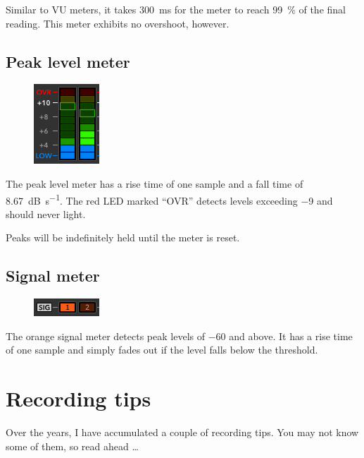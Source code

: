 Similar to VU meters, it takes \SI{300}{\milli\second} for the meter
to reach \SI{99}{\percent} of the final reading.  This meter exhibits
no overshoot, however.

\section{Peak level meter}

\begin{figure}
\includegraphics[scale=\screenshotscale,clip]{include/images/level_meter_peak.png}
\end{figure}

The peak level meter has a rise time of one sample and a fall time of
\SI{8.67}{\dB\per\second}.  The red LED marked ``OVR'' detects levels
exceeding \SI{-9}{\dBFS} and should never light.

Peaks will be indefinitely held until the meter is reset.

\section{Signal meter}

\begin{figure}
\includegraphics[scale=\screenshotscale,clip]{include/images/level_meter_signal.png}
\end{figure}

The orange signal meter detects peak levels of \SI{-60}{\dBFS} and
above.  It has a rise time of one sample and simply fades out if the
level falls below the threshold.

\chapter{Recording tips}
\label{chap:recording_tips}

Over the years, I have accumulated a couple of recording tips.  You
may not know some of them, so read ahead \dots

